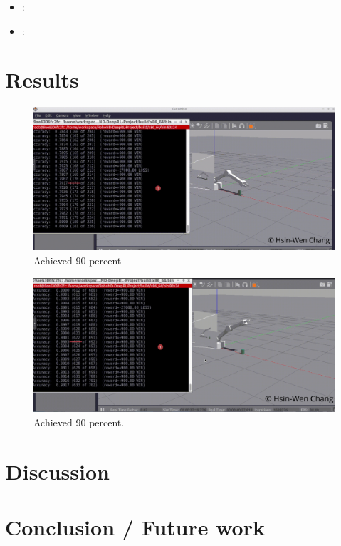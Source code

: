 \documentclass[10pt,journal,compsoc]{IEEEtran}
\begin{document}
\begin{itemize}
\item :
\item : 
\end {itemize}
\section{Results}
\begin{figure}[htpb]
      \centering
      \includegraphics[width=\linewidth]{80.png}
      \caption{Achieved 90 percent}
      \label{fig:achieved 80 percent}
\end{figure}
\begin{figure}[htpb]
      \centering
      \includegraphics[width=\linewidth]{90.png}
      \caption{Achieved 90 percent.}
      \label{fig:achieved 90 percent}
\end{figure}
\section{Discussion}
\section{Conclusion / Future work}
\end{document}
